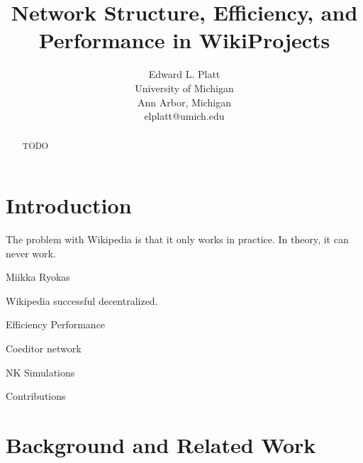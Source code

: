 \documentclass[10pt,twocolumn]{article}
\newcommand{\+}{\phantom{-}}
\begin{document}
\title{Network Structure, Efficiency, and Performance in WikiProjects}


\author{Edward L. Platt \\ University of Michigan \\ Ann Arbor, Michigan \\ elplatt@umich.edu}



%





\maketitle

\begin{abstract}
TODO
\end{abstract}

\section{Introduction}
\epigraph
{The problem with Wikipedia is that it only works in practice. In theory, it can never work.}
{Miikka Ryokas \cite{cohen_latest_2007} }

Wikipedia successful decentralized.

Efficiency Performance

Coeditor network

NK Simulations

Contributions

\section{Background and Related Work}
\end{document}
